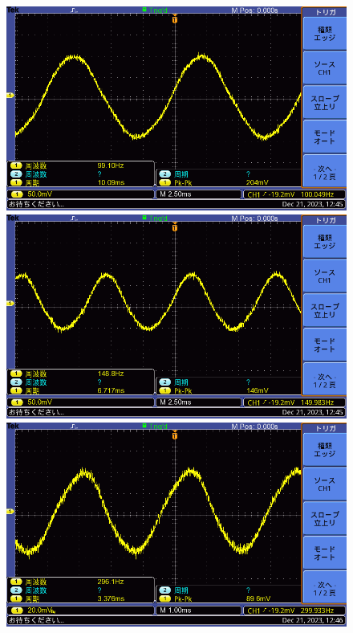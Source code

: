 \documentclass{ltjsarticle}
\begin{document}
			\begin{figure}[H]
			\centering
			\begin{minipage}{0.4\columnwidth}
			\centering
			\includegraphics[width = \columnwidth]{figs/F0021TEK.PNG}
			\end{minipage}
			\hspace{0.04\columnwidth}
			\begin{minipage}{0.4\columnwidth}
			\centering
			\includegraphics[width = \columnwidth]{figs/F0022TEK.PNG}
			\end{minipage}
			\hspace{0.04\columnwidth}
			\begin{minipage}{0.4\columnwidth}
			\centering
			\includegraphics[width = \columnwidth]{figs/F0023TEK.PNG}

\end{minipage}
\end{figure}
\end{document}
